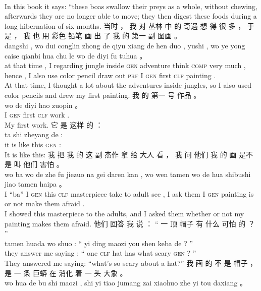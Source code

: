 \documentclass[UTF8]{ctexart}
\begin{document}
\begin{exe}
\\
\trans In this book it says: ``these boas swallow their preys as a whole, without chewing, afterwards they are no longer able to move; they then digest these foods during a long hibernation of six months. 
\ex
\glll
当时 ， 我 对 丛林 中 的 奇遇 想 得 很 多 ， 于是 ， 我 也 用 彩色 铅笔 画 出 了 我 的 第一 副 图画 。 \\
dangshi , wo dui conglin zhong de qiyu xiang de hen duo , yushi , wo ye yong caise qianbi hua chu le wo de diyi fu tuhua 。
\\
{at that time} , I regarding jungle inside \textsc{gen} adventure think \textsc{comp} very much , hence , I also use color pencil draw out \textsc{prf} I \textsc{gen} first \textsc{clf} painting .
\\
\trans At that time, I thought a lot about the adventures inside jungles, so I also used color pencils and drew my first painting. 
\ex
\glll
我 的 第一 号 作品 。 \\
wo de diyi hao zuopin 。 \\
I \textsc{gen} first \textsc{clf} work .
\\
\trans My first work. 
\ex
\glll
它 是 这样 的 ：\\
ta shi zheyang de : \\
it is {like this} \textsc{gen} :
\\
\trans It is like this:
\ex
\glll
我 把 我 的 这 副 杰作 拿 给 大人 看 ， 我 问 他们 我 的 画 是不是 叫 他们 害怕 。\\
wo ba wo de zhe fu jiezuo na gei daren kan , wo wen tamen wo de hua shibushi jiao tamen haipa 。\\
I ``ba'' I \textsc{gen} this \textsc{clf} masterpiece take to adult see , I ask them I \textsc{gen} painting {is or not} make them afraid .
\\
\trans I showed this masterpiece to the adults, and I asked them whether or not my painting makes them afraid.
\ex
\glll
他们 回答 我 说 ： “ 一 顶 帽子 有 什么 可怕 的 ？ ”\\
tamen huada wo shuo : `` yi ding maozi you shen keba de ? ''\\
they answer me saying : `` one \textsc{clf} hat has what scary \textsc{gen} ? ''
\\
\trans They answered me saying: ``what's so scary about a hat?''
\ex
\glll
我 画 的 不 是 帽子 ， 是 一 条 巨蟒 在 消化 着 一 头 大象 。\\
wo hua de bu shi maozi , shi yi tiao jumang zai xiaohuo zhe yi tou daxiang 。
\\

\end{exe}
\end{document}
